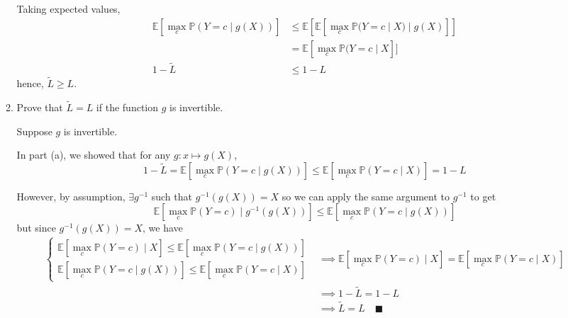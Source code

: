 \documentclass[11pt]{report}
\newcommand{\E}{\mathbb{E}}
\renewcommand{\P}{\mathbb{P}}
\begin{document}
\begin{enumerate}[1.]
\begin{enumerate}
		            Taking expected values,
		            \begin{align*}
			            \E[\max_c \P(Y = c \; | \; g(X)) ] & \leq \E[\E[\max_c \P(Y = c \; | \; X) \; | \; g(X)]] \\
			                                               & = \E[\max_c \P(Y = c \; | \; X]]                     \\
			            1 - \tilde L                       & \leq 1 - L
		            \end{align*}
		            hence, $\tilde L \geq L$.

		            \color{black}
		      \item Prove that $\tilde L = L$ if the function $g$ is invertible.

		            \color{blue}
		            Suppose $g$ is invertible.

		            In part (a), we showed that for any $g: x \mapsto g(X)$,
		            \[1 - \tilde L = \E[\max_c \P(Y = c \; | \; g(X))] \leq \E[\max_c \P(Y = c \; | \; X)] = 1 - L \]

		            However, by assumption, $\exists g^{-1}$ such that $g^{-1}(g(X)) = X$ so we can apply the same argument to $g^{-1}$ to get
		            \[\E[\max_c \P(Y = c) \; | \; g^{-1}(g(X))] \leq \E[\max_c \P(Y = c \; | \; g(X))]\]
		            but since $g^{-1}(g(X)) = X$, we have
		            \begin{align*}
			            \begin{cases}
				            \E[\max_c \P(Y = c) \; | \; X] \leq \E[\max_c \P(Y = c \; | \; g(X))] \\
				            \E[\max_c \P(Y = c \; | \; g(X))] \leq \E[\max_c \P(Y = c \; | \; X)]
			            \end{cases} & \implies \E[\max_c \P(Y = c) \; | \; X] = \E[\max_c \P(Y = c \; | \; X)]                              \\
			                                                                                     & \implies 1 - \tilde L = 1 - L            \\
			                                                                                     & \implies \tilde L = L \quad \blacksquare
		            \end{align*}



		            \color{black}


\end{enumerate}
\end{enumerate}
\end{document}

